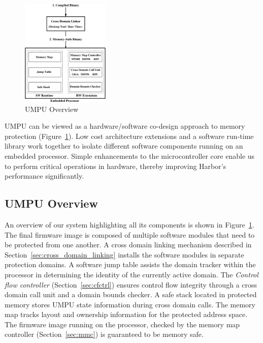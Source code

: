 \begin{figure}[htbp]
   \centering
   \includegraphics[height = 2.0in,
   keepaspectratio=true]{figures/umpuoverview.eps} 
   \caption{UMPU Overview}
   \label{fig:umpuoverview}
\end{figure}
%
UMPU can be viewed as a hardware/software co-design approach to memory
protection (Figure~\ref{fig:umpuoverview}).
%
Low cost architecture extensions and a software run-time library work
together to isolate different software components running on an
embedded processor.
%
%
Simple enhancements to the microcontroller core enable us to perform
critical operations in hardware, thereby improving Harbor's
performance significantly.
%
\subsection{UMPU Overview}
%
An overview of our system highlighting all its components is shown in
Figure~\ref{fig:umpuoverview}.
%
The final firmware image is composed of multiple software modules that
need to be protected from one another.
%
%
A cross domain linking mechanism described in
Section~\ref{sec:cross_domain_linking} installs the software modules
in separate protection domains.
%
A software jump table assists the domain tracker within the processor
in determining the identity of the currently active domain.
%
The \emph{Control flow controller} (Section~\ref{sec:cfctrl}) ensures control flow integrity through a cross domain call unit and a domain bounds checker.
%
A safe stack located in protected memory stores UMPU state information during cross domain calls.
%
The memory map tracks layout and ownership information for the protected address space.
%
The firmware image running on the processor, checked by the  memory
map controller (Section~\ref{sec:mmc}) is guaranteed to be memory
safe.
%
%

